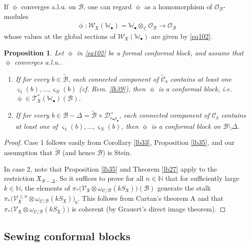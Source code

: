 \documentclass[12pt,a4paper,notitlepage]{report}
\theoremstyle{definition}
\theoremstyle{plain}
\newtheorem{pp}[df]{Proposition}
\newcommand{\fk}{\mathfrak}
\newcommand{\mc}{\mathcal}
\newcommand{\wtd}{\widetilde}
\newcommand{\scr}{\mathscr}
\newcommand{\sgm}{\varsigma}
\newcommand{\SX}{S_{\fk X}}
\newcommand{\blt}{\bullet}
\newcommand{\Wbb}{\mathbb W}
\newcommand{\Cbb}{\mathbb C}
\newcommand{\Nbb}{\mathbb N}
\numberwithin{equation}{section}
\begin{document}
If $\upphi$ converges a.l.u. on $\mc B$, one can regard $\upphi$ as a homomorphism of $\scr O_{\mc B}$-modules
\begin{align*}
\upphi:\scr W_{\fk X}(\Wbb_\blt)=\Wbb_\blt\otimes_\Cbb\scr O_{\mc B}\rightarrow\scr O_{\mc B}
\end{align*}
whose values at the global sections of $\scr W_{\fk X}(\Wbb_\blt)$  are given by \eqref{eq102}.

\begin{pp}\label{lb43}
Let $\upphi$ in \eqref{eq102} be a formal conformal block, and assume that $\upphi$ converges a.l.u..
\begin{enumerate}
\item If for every $b\in\wtd{\mc B}$, each connected component of  $\wtd{\mc C}_b$ contains at least one $\sgm_1(b),\dots,\sgm_N(b)$ (cf. Rem. \ref{lb39}), then  $\upphi$ is a conformal block, i.e. $\upphi\in\scr T_{\fk X}^*(\Wbb_\blt)(\mc B)$.
\item If  for every $b\in\mc B-\Delta=\wtd{\mc B}\times\mc D_{r_\blt\rho_\blt}^\times$, each connected component of $\mc C_b$ contains at least one of $\sgm_1(b),\dots,\sgm_N(b)$, then $\upphi$ is a conformal block on $\mc B\setminus\Delta$.
\end{enumerate}

\end{pp}


\begin{proof}
Case 1 follows easily from Corollary \ref{lb33}, Proposition \ref{lb35}, and our assumption that $\wtd{\mc B}$ (and hence $\mc B$) is Stein.

In case 2, note that Proposition \ref{lb35} and Theorem \ref{lb27} apply to the restriction $\fk X_{\mc B-\Delta}$. So it suffices to prove for all $n\in\Nbb$ that for sufficiently large $k\in\Nbb$, the elements of $\pi_*\big(\scr V_{\fk X}\otimes\omega_{\mc C/\mc B}(k S_{\fk X})\big)(\mc B)$  generate the stalk $\pi_*\big(\scr V_{\fk X}^{\leq n}\otimes\omega_{\mc C/\mc B}(k\SX)\big)_b$. This follows from Cartan's theorem A and that $\pi_*\big(\scr V_{\fk X}\otimes\omega_{\mc C/\mc B}(k S_{\fk X})\big)$ is coherent (by Grauert's direct image theorem).
\end{proof}







\subsection*{Sewing conformal blocks}
\end{document}
